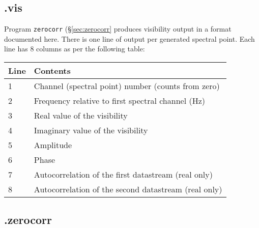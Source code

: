 
\subsection{.vis} \label{sec:vis}

Program {\tt zerocorr} (\S\ref{sec:zerocorr} produces visibility output in a format documented here.
There is one line of output per generated spectral point.
Each line has 8 columns as per the following table:
\begin{center}
\begin{tabular}{ll}
\hline
Line & Contents \\
\hline
1 & Channel (spectral point) number (counts from zero) \\
2 & Frequency relative to first spectral channel (Hz) \\
3 & Real value of the visibility \\
4 & Imaginary value of the visibility \\
5 & Amplitude \\
6 & Phase \\
7 & Autocorrelation of the first datastream (real only) \\
8 & Autocorrelation of the second datastream (real only) \\
\hline
\end{tabular}
\end{center}





\subsection{.zerocorr} \label{sec:zc}

